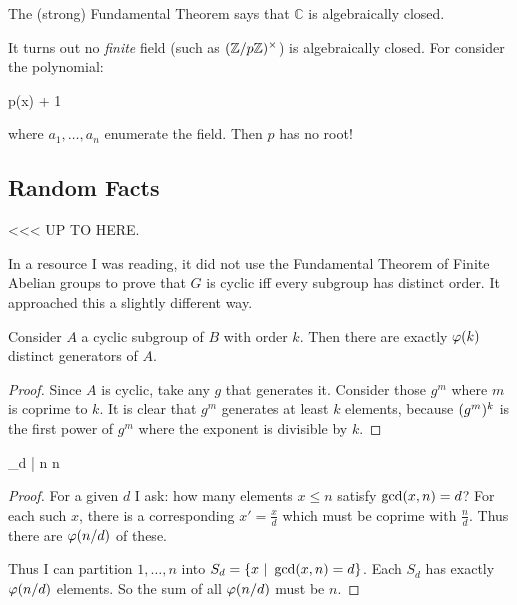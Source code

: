 \begin{remark}
  The (strong) Fundamental Theorem says that $\mathbb{C}$ is
  algebraically closed.

  It turns out no \emph{finite} field (such as $\mathopen{}\left( {\mathbb{Z} / p\mathbb{Z}} \right)\mathclose{}^\times$) is
  algebraically closed. For consider the polynomial:

  \begin{nedqn}
    p(x)
  \eqcol
    \cdots
    + 1
  \end{nedqn}

  \noindent
  where $a_1, \ldots, a_n$ enumerate the field. Then $p$ has no root!
\end{remark}

\subsection{Random Facts}

<<< UP TO HERE.

\begin{remark}
  In a resource I was reading, it did not use the Fundamental Theorem of
  Finite Abelian groups to prove that $G$ is cyclic iff every subgroup
  has distinct order. It approached this a slightly different way.
\end{remark}

\begin{lemma}
  Consider $A$ a cyclic subgroup of $B$ with order $k$. Then there are
  exactly $\varphi\mathopen{}\left( {k} \right)\mathclose{}$ distinct generators of $A$.
\end{lemma}

\begin{proof}
  Since $A$ is cyclic, take any $g$ that generates it. Consider those
  $g^m$ where $m$ is coprime to $k$. It is clear that $g^m$ generates at
  least $k$ elements, because $\mathopen{}\left( {g^m} \right)\mathclose{}^k$ is the first power of
  $g^m$ where the exponent is divisible by $k$.
\end{proof}

\begin{lemma}
  \begin{nedqn}
    \sum_{d | n} 
  \eqcol
    n
  \end{nedqn}
\end{lemma}

\begin{proof}
  For a given $d$ I ask: how many elements $x \leq n$ satisfy $\gcd\mathopen{}\left( {x,
  n} \right)\mathclose{} = d$? For each such $x$, there is a corresponding $x' =
  \frac{x}{d}$ which must be coprime with $\frac{n}{d}$. Thus there are
  $\varphi\mathopen{}\left( {n/d} \right)\mathclose{}$ of these.

  Thus I can partition $1, \ldots, n$ into $S_d = \left\{ x\ |\ \gcd\mathopen{}\left( {x,
  n} \right)\mathclose{} = d \right\}$. Each $S_d$ has exactly $\varphi\mathopen{}\left( {n/d} \right)\mathclose{}$ elements. So the sum of
  all $\varphi\mathopen{}\left( {n/d} \right)\mathclose{}$ must be $n$.
\end{proof}

